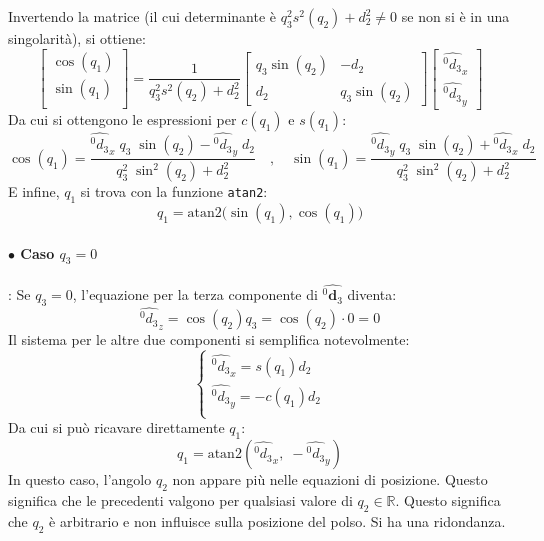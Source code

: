 ﻿\documentclass[11pt, a4paper]{article}
\begin{document}
Invertendo la matrice (il cui determinante è \(q_{3}^{2}s^{2}(q_{2}) + d_{2}^{2} \ne 0\) se non si è in una singolarità), si ottiene:
\[
    \begin{bmatrix}
        \cos(q_{1})\\
        \sin(q_{1})\\
    \end{bmatrix}
    =
    \frac{1}{q_{3}^{2}s^{2}(q_{2}) + d_{2}^{2}}
    \begin{bmatrix}
        q_{3}\sin(q_{2}) & -d_{2}\\
        d_{2} & q_{3}\sin(q_{2})
    \end{bmatrix}
    \begin{bmatrix}
        \hat{^{0}d_{3}}_{x}\\
        \hat{^{0}d_{3}}_{y}
    \end{bmatrix}
\]
Da cui si ottengono le espressioni per \(c(q_1)\) e \(s(q_1)\):
\[
    \cos(q_1) = \frac{\hat{^{0}d_{3}}_{x} \; q_3 \; \sin(q_2) - \hat{^{0}d_{3}}_{y} \; d_2}{q_3^2 \; \sin^2(q_2) + d_2^2}
    \quad , \quad
    \sin(q_1) = \frac{\hat{^{0}d_{3}}_{y} \; q_3 \; \sin(q_2) + \hat{^{0}d_{3}}_{x} \; d_2}{q_3^2 \; \sin^2(q_2) + d_2^2}
\]
E infine, \(q_1\) si trova con la funzione \texttt{atan2}:
\[
    \boxed{
        q_{1} = \text{atan2} \biggl( \sin(q_{1}), \cos(q_{1}) \biggr)
    }
\]

\paragraph{\(\bullet\) Caso \(q_{3} = 0\)}:
Se \(q_3=0\), l'equazione per la terza componente di \(\hat{^{0}\mathbf{d}_{3}}\) diventa:
\[
    \hat{^{0}d_{3}}_{z} = \cos(q_{2})q_{3} = \cos(q_{2}) \cdot 0 = 0
\]
Il sistema per le altre due componenti si semplifica notevolmente:
\[
    \begin{cases}
        \hat{^{0}d_{3}}_{x} = s(q_{1})d_{2}\\
        \hat{^{0}d_{3}}_{y} = -c(q_{1})d_{2}\\
    \end{cases}
\]
Da cui si può ricavare direttamente \(q_1\):
\[
    \boxed{q_{1} = \text{atan2}( \hat{^{0}d_{3}}_{x}, \;-\hat{^{0}d_{3}}_{y} )}
\]
In questo caso, l'angolo \(q_2\) non appare più nelle equazioni di posizione. Questo significa che le precedenti valgono per qualsiasi valore di \(q_2 \in \mathbb{R}\). Questo significa che \(q_2\) è arbitrario e non influisce sulla posizione del polso. Si ha una ridondanza.
\end{document}

